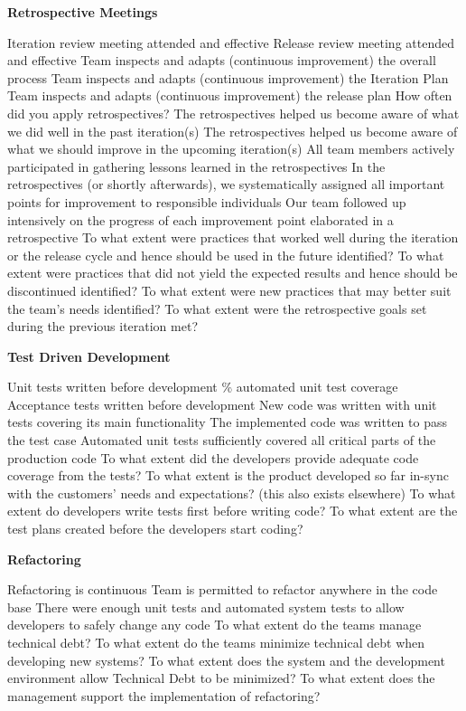 \textbf{Retrospective Meetings}
\begin{itemize}
	\taa Iteration review meeting attended and effective
	\taa Release review meeting attended and effective
	\taar Team inspects and adapts (continuous improvement) the overall process
	\taar Team inspects and adapts (continuous improvement) the Iteration Plan
	\taar Team inspects and adapts (continuous improvement) the release plan
	\pamr How often did you apply retrospectives? %
	\pamr The retrospectives helped us become aware of what we did well in the past iteration(s)
	\pamr The retrospectives helped us become aware of what we should improve in the upcoming iteration(s)
	\pamr All team members actively participated in gathering lessons learned in the retrospectives
	\pamr In the retrospectives (or shortly afterwards), we systematically assigned all important points for improvement to responsible individuals
	\pamr Our team followed up intensively on the progress of each improvement point elaborated in a retrospective
	\ops To what extent were practices that worked well during the iteration or the release cycle and hence should be used in the future identified?
	\ops To what extent were practices that did not yield the expected results and hence should be discontinued identified?
	\ops To what extent were new practices that may better suit the team's needs identified?
	\ops To what extent were the retrospective goals set during the previous iteration met? 
\end{itemize}

\textbf{Test Driven Development}
\begin{itemize}
	\taa Unit tests written before development
	\% automated unit test coverage
	\taar Acceptance tests written before development
	\pam New code was written with unit tests covering its main functionality
	\pam The implemented code was written to pass the test case
	\pamr Automated unit tests sufficiently covered all critical parts of the production code
	\ops To what extent did the developers provide adequate code coverage from the tests?
	\ops To what extent is the product developed so far in-sync with the customers' needs and expectations? (this also exists elsewhere)
	\ops To what extent do developers write tests first before writing code?
	\ops To what extent are the test plans created before the developers start coding? 
\end{itemize}

\textbf{Refactoring}
\begin{itemize}
	\taa Refactoring is continuous
	\taar Team is permitted to refactor anywhere in the code base
	\pamr There were enough unit tests and automated system tests to allow developers to safely change any code
	\ops To what extent do the teams manage technical debt? 
	\ops To what extent do the teams minimize technical debt when developing new systems? 
	\ops To what extent does the system and the development environment allow Technical Debt to be minimized? 
	\ops To what extent does the management support the implementation of refactoring? 
\end{itemize}

